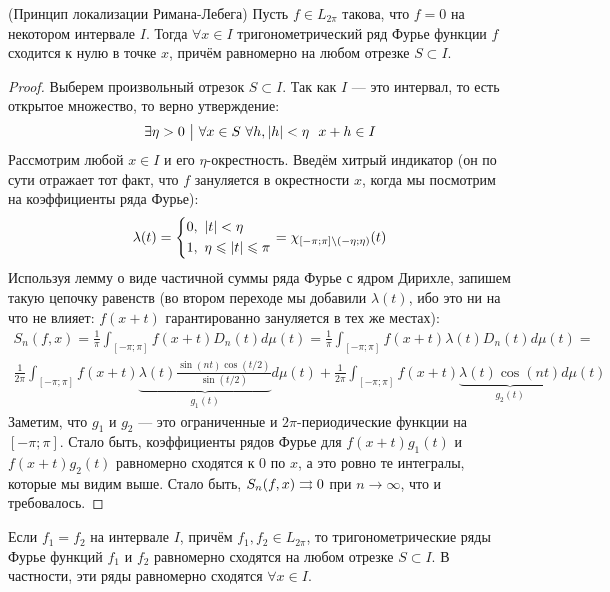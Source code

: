 \begin{theorem} (Принцип локализации Римана-Лебега)
	Пусть $f \in L_{2\pi}$ такова, что $f = 0$ на некотором интервале $I$. Тогда $\forall x \in I$ тригонометрический ряд Фурье функции $f$ сходится к нулю в точке $x$, причём равномерно на любом отрезке $S \subset I$.
\end{theorem}

\begin{proof}
	Выберем произвольный отрезок $S \subset I$. Так как $I$ --- это интервал, то есть открытое множество, то верно утверждение:
	\[
		\exists \eta > 0 \such \forall x \in S\ \forall h, |h| < \eta\ \ x + h \in I
	\]
	Рассмотрим любой $x \in I$ и его $\eta$-окрестность. Введём хитрый индикатор (он по сути отражает тот факт, что $f$ зануляется в окрестности $x$, когда мы посмотрим на коэффициенты ряда Фурье):
	\[
		\lambda(t) = \left\{ \begin{aligned} 
			&{0,\ |t| < \eta}
			\\
			&{1,\ \eta \leqslant |t| \leqslant \pi}
		 \end{aligned} \right.
		= \chi_{[-\pi; \pi] \backslash (-\eta; \eta)}(t)
	\]
	Используя лемму о виде частичной суммы ряда Фурье с ядром Дирихле, запишем такую цепочку равенств (во втором переходе мы добавили $\lambda(t)$, ибо это ни на что не влияет: $f(x + t)$ гарантированно зануляется в тех же местах):
	\begin{multline*}
		S_n(f, x) = \frac{1}{\pi} \int_{[-\pi; \pi]} f(x + t)D_n(t)d\mu(t) = \frac{1}{\pi} \int_{[-\pi; \pi]} f(x + t)\lambda(t)D_n(t)d\mu(t) =
		\\
		\frac{1}{2\pi} \int_{[-\pi; \pi]} f(x + t)\underbrace{\lambda(t) \frac{\sin(nt)\cos(t / 2)}{\sin(t / 2)}}_{g_1(t)}d\mu(t) + \frac{1}{2\pi} \int_{[-\pi; \pi]} f(x + t)\underbrace{\lambda(t)\cos(nt)}_{g_2(t)}d\mu(t)
	\end{multline*}
	Заметим, что $g_1$ и $g_2$ --- это ограниченные и $2\pi$-периодические функции на $[-\pi; \pi]$. Стало быть, коэффициенты рядов Фурье для $f(x + t)g_1(t)$ и $f(x + t)g_2(t)$ равномерно сходятся к 0 по $x$, а это ровно те интегралы, которые мы видим выше. Стало быть, $S_n(f, x) \rightrightarrows 0$ при $n \to \infty$, что и требовалось.
\end{proof}

\begin{corollary}
	Если $f_1 = f_2$ на интервале $I$, причём $f_1, f_2 \in L_{2\pi}$, то тригонометрические ряды Фурье функций $f_1$ и $f_2$ равномерно сходятся на любом отрезке $S \subset I$. В частности, эти ряды равномерно сходятся $\forall x \in I$.
\end{corollary}

